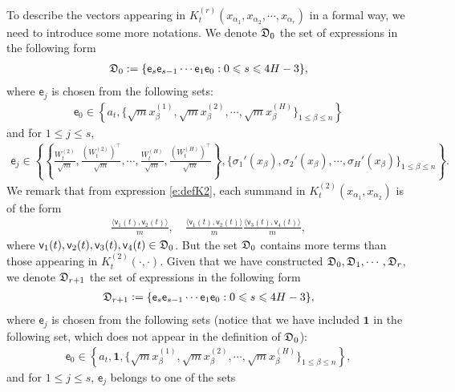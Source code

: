 \documentclass{article}
\numberwithin{equation}{section}
\newcommand{\fD}{{\frak D}}
\newcommand{\sfe}{{\mathsf e}}
\newcommand{\sfv}{{\mathsf v}}
\newcommand{\al}{\alpha}
\newcommand{\deq}{\mathrel{\mathop:}=} %
\renewcommand{\leq}{\leqslant}
\newcommand{\1}{\mathds{1}}
\theoremstyle{plain} %
\begin{document}
To describe the vectors appearing in $K_t^{(r)}(x_{\al_1}, x_{\al_2}, \cdots, x_{\al_r})$ in a formal way, we need to introduce some more notations. We denote $\fD_0$ the set of expressions in the following form 
\begin{align}\label{e:defD1}
\fD_0: = \{ \sfe_s \sfe_{s-1}\cdots \sfe_{1}\sfe_0:   0\leq s\leq 4H-3 \}, 
\end{align}
where %
$\sfe_j$ is chosen from the following sets:  
\begin{align*}
\sfe_0\in \left\{a_t, \{\sqrt m x^{(1)}_\beta, \sqrt m x^{(2)}_\beta, \cdots, \sqrt m x^{(H)}_\beta\}_{1\leq \beta\leq n}\right\}
\end{align*}
and for $1\leq j\leq s$,
\begin{align*}
\sfe_j\in \left\{\left\{\frac{W_t^{(2)}}{\sqrt m},\frac{(W_t^{(2)})^\top}{\sqrt m},\cdots, \frac{W_t^{(H)}}{\sqrt m},\frac{(W_t^{(H)})^\top}{\sqrt m}\right\} , \{\sigma_1'(x_\beta), \sigma_2'(x_\beta), \cdots, \sigma_H'(x_\beta)\}_{1\leq \beta\leq n}\right\}.
\end{align*}
We remark that from expression \eqref{e:defK2}, each summand in  $K_t^{(2)}(x_{\al_1}, x_{\al_2})$ is of the form  
\begin{align*}
\frac{\langle \sfv_1(t), \sfv_2(t)\rangle}{m}, \quad \frac{\langle \sfv_1(t), \sfv_2(t)\rangle}{m}\frac{\langle \sfv_3(t), \sfv_4(t)\rangle}{m},
\end{align*}
where $\sfv_1(t), \sfv_2(t),\sfv_3(t), \sfv_4(t)\in \fD_0$. But the set $\fD_0$  contains more terms than those appearing in $K_t^{(2)}(\cdot, \cdot)$.
Given that we have constructed $\fD_0, \fD_1, \cdots, \fD_r$, we denote $\fD_{r+1}$ the set of expressions in the following form
\begin{align}\label{e:term}
\fD_{r+1}\deq\{\sfe_s \sfe_{s-1} \cdots \sfe_1\sfe_0: 0\leq s\leq 4H-3\},
\end{align}
where $\sfe_j$ is chosen from the following sets   (notice that  we have included  $\bm1 $  in the following set, 
which does not appear in the definition of $\fD_0$): 
\begin{align*}
\sfe_0\in \left\{a_t, \bm1,\{\sqrt m x^{(1)}_\beta, \sqrt m x^{(2)}_\beta, \cdots, \sqrt m x^{(H)}_\beta\}_{1\leq \beta\leq n}\right\},
\end{align*}
and for $1\leq j\leq s$, $\sfe_j$ belongs to one of the sets
\end{document}
